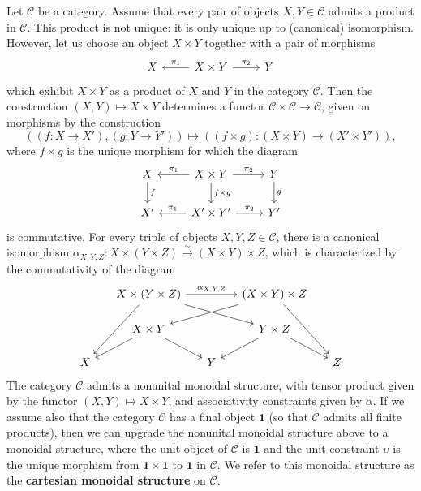 \begin{example}\label{monoidal cat Cartesian product construction}
Let $\mathcal{C}$ be a category. Assume that every pair of objects $X,Y\in\mathcal{C}$ admits a product in $\mathcal{C}$. This product is not unique: it is only unique up to (canonical) isomorphism. However, let us choose an object $X\times Y$ together with a pair of morphisms
\[\begin{tikzcd}
X&X\times Y\ar[l,swap,"\pi_1"]\ar[r,"\pi_2"]&Y
\end{tikzcd}\]
which exhibit $X\times Y$ as a product of $X$ and $Y$ in the category $\mathcal{C}$. Then the construction $(X,Y)\mapsto X\times Y$ determines a functor $\mathcal{C}\times\mathcal{C}\to\mathcal{C}$, given on morphisms by the construction
\[((f:X\to X'),(g:Y\to Y'))\mapsto((f\times g):(X\times Y)\to(X'\times Y')),\]
where $f\times g$ is the unique morphism for which the diagram
\[\begin{tikzcd}
X\ar[d,"f"]&X\times Y\ar[d,"f\times g"]\ar[l,swap,"\pi_1"]\ar[r,"\pi_2"]&Y\ar[d,"g"]\\
X'&X'\times Y'\ar[l,swap,"\pi_1"]\ar[r,"\pi_2"]&Y'
\end{tikzcd}\]
is commutative. For every triple of objects $X,Y,Z\in\mathcal{C}$, there is a canonical isomorphism $\alpha_{X,Y,Z}:X\times(Y\times Z)\stackrel{\sim}{\to}(X\times Y)\times Z$, which is characterized by the commutativity of the diagram
\[\begin{tikzcd}[row sep=5mm,column sep=5mm]
&X\times(Y\times Z)\ar[ldd]\ar[rrd]\ar[rr,"\alpha_{X,Y,Z}"]&&(X\times Y)\times Z\ar[rdd]\ar[lld]\\
&X\times Y\ar[rd]\ar[ld]&&Y\times Z\ar[rd]\ar[ld]&\\
X&&Y&&Z
\end{tikzcd}\]
The category $\mathcal{C}$ admits a nonunital monoidal structure, with tensor product given by the functor $(X,Y)\mapsto X\times Y$, and associativity constraints given by $\alpha$. If we assume also that the category $\mathcal{C}$ has a final object $\mathbf{1}$ (so that $\mathcal{C}$ admits all finite products), then we can upgrade the nonunital monoidal structure above to a monoidal structure, where the unit object of $\mathcal{C}$ is $\mathbf{1}$ and the unit constraint $\upsilon$ is the unique morphism from $\mathbf{1}\times\mathbf{1}$ to $\mathbf{1}$ in $\mathcal{C}$. We refer to this monoidal structure as the \textbf{cartesian monoidal structure} on $\mathcal{C}$.
\end{example}
